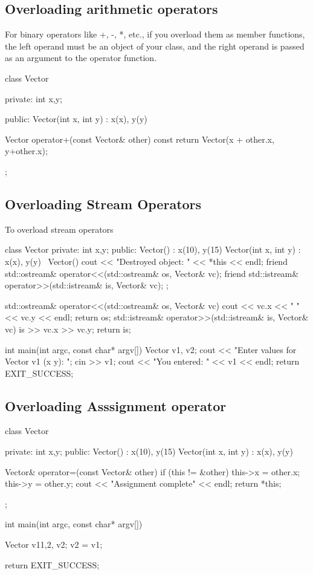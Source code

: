 \documentclass{report}
\begin{document}
    

    \pagebreak
    \bigbreak \noindent 
    \subsection{Overloading arithmetic operators}
    \bigbreak \noindent 
    For binary operators like +, -, *, etc., if you overload them as member functions, the left operand must be an object of your class, and the right operand is passed as an argument to the operator function.
    \bigbreak \noindent 
    \begin{cppcode}
class Vector {
    private:
        int x,y;

    public:
        Vector(int x, int y) : x(x), y(y) {}

        Vector operator+(const Vector& other) const {
            return Vector(x + other.x, y+other.x);
        }
};
    \end{cppcode}
    \bigbreak \noindent 

    \bigbreak \noindent 
    \subsection{Overloading Stream Operators}
    To overload stream operators
    \bigbreak \noindent 
    \begin{cppcode}
class Vector {
    private:
        int x,y;
    public:
        Vector() : x(10), y(15) {}
        Vector(int x, int y) : x(x),  y(y) {}
        ~Vector() {
            cout << "Destroyed object: " << *this << endl;
        }
    friend std::ostream& operator<<(std::ostream& os, Vector& vc);
    friend std::istream& operator>>(std::istream& is, Vector& vc);
};

std::ostream& operator<<(std::ostream& os, Vector& vc) {
    cout << vc.x << " " << vc.y << endl;
    return os;
}
std::istream& operator>>(std::istream& is, Vector& vc) {
    is >> vc.x >> vc.y;
    return is;
}

int main(int argc, const char* argv[]) {
     Vector v1, v2;
    cout << "Enter values for Vector v1 (x y): ";
    cin >> v1;
    cout << "You entered: " << v1 << endl; return EXIT_SUCCESS; }
    \end{cppcode}
    \bigbreak \noindent 

    \pagebreak
    \subsection{Overloading Asssignment operator}
    \bigbreak \noindent 
    \begin{cppcode}
class Vector {
    private:
        int x,y;
    public:
        Vector() : x(10), y(15) {}
        Vector(int x, int y) : x(x),  y(y) {}

        Vector& operator=(const Vector& other) {
            if (this != &other) {
                this->x = other.x;
                this->y = other.y;
            }
            cout << "Assignment complete" << endl;
            return *this;
        }
};

int main(int argc, const char* argv[]) {
    Vector v1{1,2}, v2;
    v2 = v1;

    return EXIT_SUCCESS;
}
    \end{cppcode}
\end{document}
